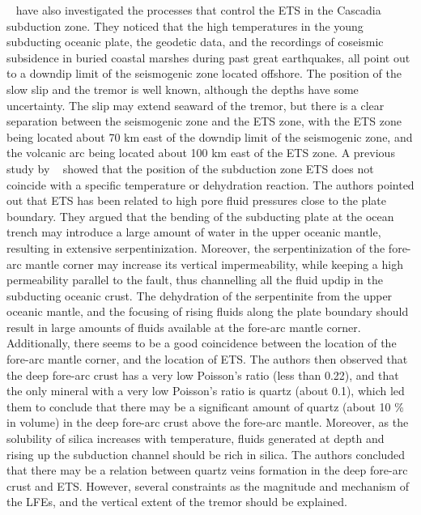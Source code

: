 \documentclass[draft]{agujournal2019}
\begin{document}
~ have also investigated the processes that control the ETS in the Cascadia subduction zone. They noticed that the high temperatures in the young subducting oceanic plate, the geodetic data, and the recordings of coseismic subsidence in buried coastal marshes during past great earthquakes, all point out to a downdip limit of the seismogenic zone located offshore. The position of the slow slip and the tremor is well known, although the depths have some uncertainty. The slip may extend seaward of the tremor, but there is a clear separation between the seismogenic zone and the ETS zone, with the ETS zone being located about 70 km east of the downdip limit of the seismogenic zone, and the volcanic arc being located about 100 km east of the ETS zone. A previous study by ~ showed that the position of the subduction zone ETS does not coincide with a specific temperature or dehydration reaction. The authors pointed out that ETS has been related to high pore fluid pressures close to the plate boundary. They argued that the bending of the subducting plate at the ocean trench may introduce a large amount of water in the upper oceanic mantle, resulting in extensive serpentinization. Moreover, the serpentinization of the fore-arc mantle corner may increase its vertical impermeability, while keeping a high permeability parallel to the fault, thus channelling all the fluid updip in the subducting oceanic crust. The dehydration of the serpentinite from the upper oceanic mantle, and the focusing of rising fluids along the plate boundary should result in large amounts of fluids available at the fore-arc mantle corner. Additionally, there seems to be a good coincidence between the location of the fore-arc mantle corner, and the location of ETS. The authors then observed that the deep fore-arc crust has a very low Poisson's ratio (less than 0.22), and that the only mineral with a very low Poisson's ratio is quartz (about 0.1), which led them to conclude that there may be a significant amount of quartz (about 10 \% in volume) in the deep fore-arc crust above the fore-arc mantle. Moreover, as the solubility of silica increases with temperature, fluids generated at depth and rising up the subduction channel should be rich in silica. The authors concluded that there may be a relation between quartz veins formation in the deep fore-arc crust and ETS. However, several constraints as the magnitude and mechanism of the LFEs, and the vertical extent of the tremor should be explained. \\
\end{document}
